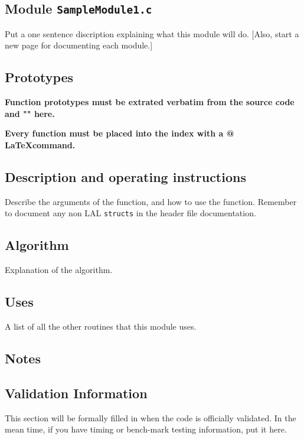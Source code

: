 \documentclass[oneside]{book}
\begin{document}
\newpage

\subsection{Module {\texttt {SampleModule1.c}}}
Put a one sentence discription explaining what this module will do. 
[Also, start a new page for documenting each module.]

\subsection*{Prototypes}
{\bf Function prototypes must be extrated verbatim from
the source code and "{\verb@@}" here.}

{\bf Every function must be placed into the index with
a \verb@{}@ \LaTeX command.}

\subsection*{Description and operating instructions}
Describe the arguments of the function, and how to use the function.
Remember to document any non LAL {\tt structs} in the header
file documentation.

\subsection*{Algorithm}
Explanation of the algorithm.

\subsection*{Uses}
A list of all the other routines that this module uses.

\subsection*{Notes}

\subsection*{Validation Information}

This section will be formally filled in when the code is officially
validated. In the mean time, if you have timing or bench-mark testing
information, put it here.
\end{document}

